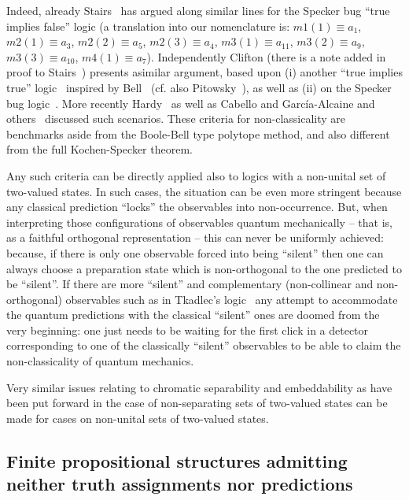 Indeed, already Stairs~\cite[p.~588-589]{stairs83} has argued along similar lines for the Specker bug
``true implies false'' logic (a translation into our nomenclature
is:
$m1(1) \equiv a_1$,
$m2(1) \equiv a_3$,
$m2(2) \equiv a_5$,
$m2(3) \equiv a_4$,
$m3(1) \equiv a_{11}$,
$m3(2) \equiv a_9$,
$m3(3) \equiv a_{10}$,
$m4(1) \equiv a_7$).
Independently Clifton (there is a note added in proof to Stairs~\cite[p.~588-589]{stairs83})
presents asimilar argument, based upon (i) another ``true implies true'' logic~\cite[Sects.~II,III, Figure~1]{clifton-93,Johansen-1994,Vermaas-1994}
inspired by Bell~\cite[Figure~C.l. p.~67]{Belinfante-73} (cf. also Pitowsky~\cite[p.~394]{Pitowsky-1982-subs}),
as well as (ii) on the Specker bug logic~\cite[Sects.~IV, Figure~2]{clifton-93}.
More recently Hardy~\cite{Hardy-92,Hardy-93,hardy-97}
as well as Cabello and
Garc{\'{i}}a-Alcaine and
others~\cite{Cabello-1995-ppks,cabello-96,cabello-97-nhvp,Badziag-2011,Cabello-2013-HP,Cabello-2013-Hardylike} discussed such scenarios.
These criteria for non-classicality are benchmarks aside from the Boole-Bell type polytope method,
and also different from the full Kochen-Specker theorem.

Any such criteria can be directly applied also to logics with a non-unital set of two-valued states.
In such cases, the situation can be even more stringent because any classical prediction ``locks'' the observables into non-occurrence.
But, when interpreting those configurations of observables quantum mechanically
--
that is, as a faithful orthogonal representation
--
this can never be uniformly achieved:
because, if there is only one observable forced into being ``silent''
then one can always choose a preparation state which is non-orthogonal to the one predicted to be ``silent''.
If there are more ``silent'' and complementary (non-collinear and non-orthogonal)
observables such as in Tkadlec's logic~\cite[Figure~2, p.~207]{tkadlec-96}
any attempt to accommodate the quantum predictions with the classical ``silent'' ones are doomed from the very beginning:
one just needs to be waiting for the first click in a detector corresponding to one of the classically ``silent'' observables
to be able to claim the non-classicality of quantum mechanics.


Very similar issues relating to chromatic separability and embeddability as have been put forward in the case of non-separating sets of two-valued states can be
made for cases on non-unital sets of two-valued states.

\subsection{Finite propositional structures admitting neither truth assignments nor predictions}
\label{2017-b-c-lwtvs}

